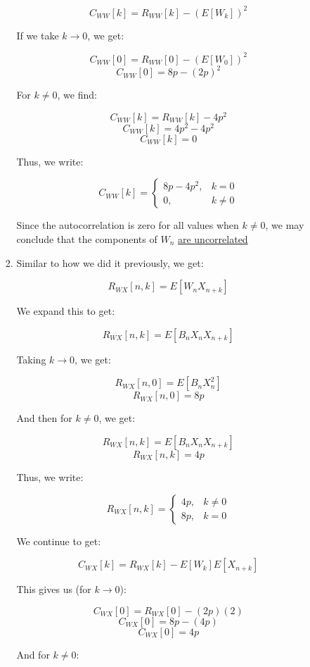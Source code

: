 \begin{enumerate}
\begin{enumerate}
\begin{enumerate}
            $$C_{WW}[k]=R_{WW}[k]-(E[W_k])^2$$

            If we take $k\to0$, we get:
            
            $$C_{WW}[0]=R_{WW}[0]-(E[W_0])^2$$
            $$C_{WW}[0]=8p-(2p)^2$$

            For $k\neq0$, we find:

            $$C_{WW}[k]=R_{WW}[k]-4p^2$$
            $$C_{WW}[k]=4p^2-4p^2$$
            $$C_{WW}[k]=0$$

            Thus, we write:

            $$\boxed{C_{WW}[k]=\left\{\begin{array}{ll} 8p-4p^2, & k=0\\ 0, & k\neq0\end{array}}$$

            Since the autocorrelation is zero for all values when $k\neq0$, we may conclude that the components of $W_n$ \underline{are uncorrelated}

          \item Similar to how we did it previously, we get:

            $$R_{WX}[n,k]=E[W_nX_{n+k}]$$

            We expand this to get:

            $$R_{WX}[n,k]=E[B_nX_nX_{n+k}]$$

            Taking $k\to0$, we get:

            $$R_{WX}[n,0]=E[B_nX_n^2]$$
            $$R_{WX}[n,0]=8p$$

            And then for $k\neq0$, we get:

            $$R_{WX}[n,k]=E[B_nX_nX_{n+k}]$$
            $$R_{WX}[n,k]=4p$$

            Thus, we write:

            $$\boxed{R_{WX}[n,k]=\left\{\begin{array}{ll} 4p, & k\neq0\\ 8p, & k=0\end{array}}$$

            We continue to get:

            $$C_{WX}[k]=R_{WX}[k]-E[W_k]E[X_{n+k}]$$

            This gives us (for $k\to0$):

            $$C_{WX}[0]=R_{WX}[0]-(2p)(2)$$
            $$C_{WX}[0]=8p-(4p)$$
            $$C_{WX}[0]=4p$$

            And for $k\neq0$:


\end{enumerate}
\end{enumerate}
\end{enumerate}
